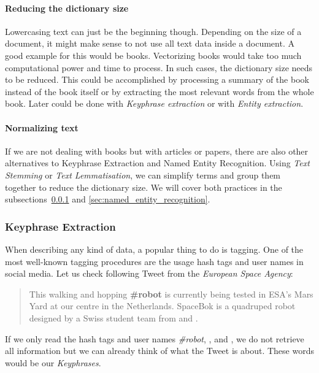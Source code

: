 \paragraph{Reducing the dictionary size}
Lowercasing text can just be the beginning though.
Depending on the size of a document, it might make sense to not use all text data inside a document.
A good example for this would be books.
Vectorizing books would take too much computational power and time to process.
In such cases, the dictionary size needs to be reduced.
This could be accomplished by processing a summary of the book instead of the book itself
or by extracting the most relevant words from the whole book.
Later could be done with \textit{Keyphrase extraction} or with \textit{Entity extraction}.

\paragraph{Normalizing text}
If we are not dealing with books but with articles or papers,
there are also other alternatives to Keyphrase Extraction and Named Entity Recognition.
Using \textit{Text Stemming} or \textit{Text Lemmatisation}, we can simplify terms and group them together to reduce
the dictionary size.
We will cover both practices in the subsections~\ref{sec:keyphrase_extraction} and \ref{sec:named_entity_recognition}.

\subsubsection{Keyphrase Extraction}
\label{sec:keyphrase_extraction}
When describing any kind of data, a popular thing to do is tagging.
One of the most well-known tagging procedures are the usage hash tags and user names in social media.
Let us check following Tweet from the \textit{European Space Agency}\cite{ESATweet}:

\begin{quotation}
    This walking and hopping \textbf{\#robot} is currently being tested in ESA’s Mars Yard
    at our \textbf{} centre in the Netherlands.
    SpaceBok is a quadruped robot designed by a Swiss student team from \textbf{}
    and \textbf{}.
\end{quotation}

If we only read the hash tags and user names \textit{\#robot}, \textit{},
\textit{} and \textit{},
we do not retrieve all information but we can already think of what the Tweet is about.
These words would be our \textit{Keyphrases}.

